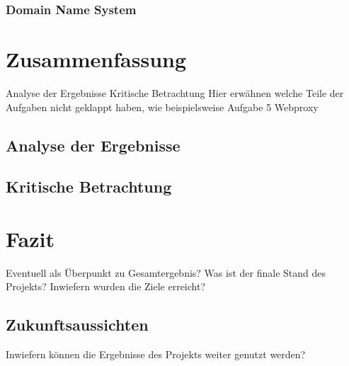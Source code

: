 \documentclass[fontsize=12pt,paper=a4,open=any,parskip=half,
  twoside=false,toc=listof,toc=bibliography,fleqn,leqno,
  captions=nooneline,captions=tableabove,british]{scrbook}
\begin{document}
\subsection{Domain Name System}


\chapter{Zusammenfassung}
Analyse der Ergebnisse
Kritische Betrachtung
Hier erwähnen welche Teile der Aufgaben nicht geklappt haben, wie beispielsweise Aufgabe 5 Webproxy
\section{Analyse der Ergebnisse}
\section{Kritische Betrachtung}

\chapter{Fazit}\label{ch:fazit}
Eventuell als Überpunkt zu Gesamtergebnis?
Was ist der finale Stand des Projekts?
Inwiefern wurden die Ziele erreicht?

\section{Zukunftsaussichten}
Inwiefern können die Ergebnisse des Projekts weiter genutzt werden?
\par


\printbibliography[title=Literaturverzeichnis]
\end{document}
